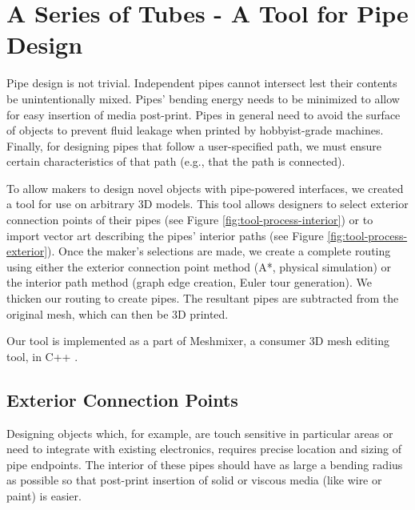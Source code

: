 \section{A Series of Tubes - A Tool for Pipe Design}

Pipe design is not trivial.  Independent pipes cannot intersect lest their contents be unintentionally mixed.  Pipes' bending energy needs to be minimized to allow for easy insertion of media post-print.  Pipes in general need to avoid the surface of objects to prevent fluid leakage when printed by hobbyist-grade machines.  Finally, for designing pipes that follow a user-specified path, we must ensure certain characteristics of that path (e.g., that the path is connected).

To allow makers to design novel objects with pipe-powered interfaces, we created a tool for use on arbitrary 3D models.  This tool allows designers to select exterior connection points of their pipes (see Figure \ref{fig:tool-process-interior}) or to import vector art describing the pipes' interior paths (see Figure \ref{fig:tool-process-exterior}).  Once the maker's selections are made, we create a complete routing using either the exterior connection point method (A*, physical simulation) or the interior path method (graph edge creation, Euler tour generation).  We thicken our routing to create pipes.   The resultant pipes are subtracted from the original mesh, which can then be 3D printed.

Our tool is implemented as a part of Meshmixer, a consumer 3D mesh editing tool, in C++ \cite{Schmidt-meshmixer}.

\subsection{Exterior Connection Points}

Designing objects which, for example, are touch sensitive in particular areas or need to integrate with existing electronics, requires precise location and sizing of pipe endpoints.  The interior of these pipes should have as large a bending radius as possible so that post-print insertion of solid or viscous media (like wire or paint) is easier.

